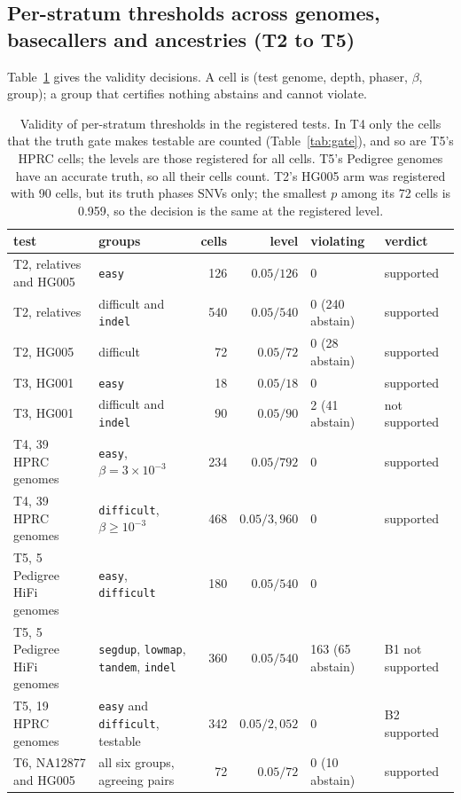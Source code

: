 \documentclass[11pt]{article}
\theoremstyle{definition}
\theoremstyle{remark}
\begin{document}
\subsection{Per-stratum thresholds across genomes, basecallers and ancestries (T2 to T5)}

Table~\ref{tab:main} gives the validity decisions. A cell is (test genome,
depth, phaser, $\beta$, group); a group that certifies nothing abstains and
cannot violate.

\begin{table}[t]
\centering\footnotesize
\begin{tabular}{@{}p{3.3cm}p{3.6cm}rrp{1.9cm}p{1.9cm}@{}}
\toprule
test & groups & cells & level & violating & verdict\\
\midrule
T2, relatives and HG005 & \texttt{easy} & 126 & $0.05/126$ & 0 & supported\\
T2, relatives & difficult and \texttt{indel} & 540 & $0.05/540$ & 0 (240 abstain) & supported\\
T2, HG005 & difficult & 72 & $0.05/72$ & 0 (28 abstain) & supported\\
T3, HG001 & \texttt{easy} & 18 & $0.05/18$ & 0 & supported\\
T3, HG001 & difficult and \texttt{indel} & 90 & $0.05/90$ & 2 (41 abstain) & not supported\\
T4, 39 HPRC genomes & \texttt{easy}, $\beta=3\times10^{-3}$ & 234 & $0.05/792$ & 0 & supported\\
T4, 39 HPRC genomes & \texttt{difficult}, $\beta\ge10^{-3}$ & 468 & $0.05/3{,}960$ & 0 & supported\\
T5, 5 Pedigree HiFi genomes & \texttt{easy}, \texttt{difficult} & 180 & $0.05/540$ & 0 & \\
T5, 5 Pedigree HiFi genomes & \texttt{segdup}, \texttt{lowmap}, \texttt{tandem}, \texttt{indel} & 360 & $0.05/540$ & 163 (65 abstain) & B1 not supported\\
T5, 19 HPRC genomes & \texttt{easy} and \texttt{difficult}, testable & 342 & $0.05/2{,}052$ & 0 & B2 supported\\
T6, NA12877 and HG005 & all six groups, agreeing pairs & 72 & $0.05/72$ & 0 (10 abstain) & supported\\
\bottomrule
\end{tabular}
\caption{Validity of per-stratum thresholds in the registered tests. In
T4 only the cells that the truth gate makes testable are counted
(Table~\ref{tab:gate}), and so are T5's HPRC cells; the levels are those
registered for all cells. T5's Pedigree genomes have an accurate truth, so
all their cells count. T2's
HG005 arm was registered with 90 cells, but its truth phases SNVs only;
the smallest $p$ among its 72 cells is 0.959, so the decision is the same
at the registered level.}
\label{tab:main}
\end{table}
\end{document}
